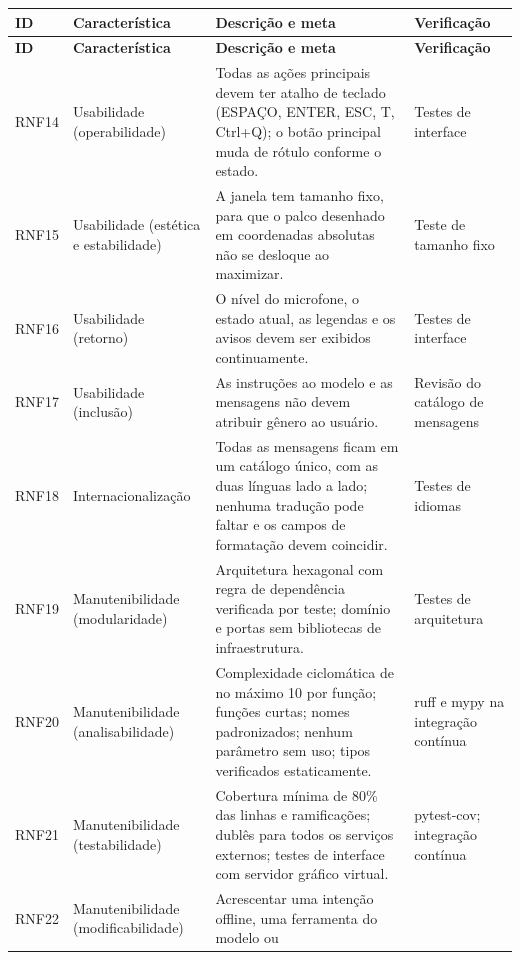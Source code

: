\begin{singlespace}
\label{qua:rnf-2}
\small
\begin{tabularx}{\textwidth}{|C{1.4cm}|P{3.1cm}|L|P{2.8cm}|}
\hline
\textbf{ID} & \textbf{Característica} & \textbf{Descrição e meta} & \textbf{Verificação} \\ \hline
\endfirsthead
\hline
\textbf{ID} & \textbf{Característica} & \textbf{Descrição e meta} & \textbf{Verificação} \\ \hline
\endhead
RNF14 & Usabilidade (operabilidade) & Todas as ações principais devem ter atalho de teclado (ESPAÇO, ENTER,
        ESC, T, Ctrl+Q); o botão principal muda de rótulo conforme o estado. & Testes de interface \\ \hline
RNF15 & Usabilidade (estética e estabilidade) & A janela tem tamanho fixo, para que o palco desenhado em
        coordenadas absolutas não se desloque ao maximizar. & Teste de tamanho fixo \\ \hline
RNF16 & Usabilidade (retorno) & O nível do microfone, o estado atual, as legendas e os avisos devem ser
        exibidos continuamente. & Testes de interface \\ \hline
RNF17 & Usabilidade (inclusão) & As instruções ao modelo e as mensagens não devem atribuir gênero ao
        usuário. & Revisão do catálogo de mensagens \\ \hline
RNF18 & Internacionalização & Todas as mensagens ficam em um catálogo único, com as duas línguas lado a lado;
        nenhuma tradução pode faltar e os campos de formatação devem coincidir. & Testes de idiomas \\ \hline
RNF19 & Manutenibilidade (modularidade) & Arquitetura hexagonal com regra de dependência verificada por
        teste; domínio e portas sem bibliotecas de infraestrutura. & Testes de arquitetura \\ \hline
RNF20 & Manutenibilidade (analisabilidade) & Complexidade ciclomática de no máximo 10 por função;
        funções curtas; nomes padronizados; nenhum parâmetro sem uso; tipos verificados estaticamente. & ruff e mypy na integração contínua \\ \hline
RNF21 & Manutenibilidade (testabilidade) & Cobertura mínima de 80\% das linhas e ramificações; dublês para
        todos os serviços externos; testes de interface com servidor gráfico virtual. & pytest-cov; integração contínua \\ \hline
RNF22 & Manutenibilidade (modificabilidade) & Acrescentar uma intenção offline, uma ferramenta do modelo ou

\end{tabularx}
\end{singlespace}
